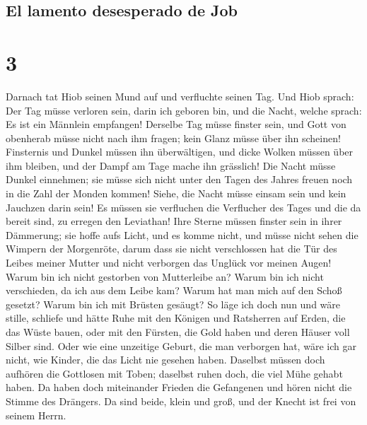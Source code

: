 \hypertarget{el-lamento-desesperado-de-job}{%
\subsection{El lamento desesperado de
Job}\label{el-lamento-desesperado-de-job}}

\hypertarget{section-2}{%
\section{3}\label{section-2}}

 Darnach tat Hiob seinen Mund auf und verfluchte seinen
Tag.  Und Hiob sprach:  Der Tag müsse
verloren sein, darin ich geboren bin, und die Nacht, welche sprach: Es
ist ein Männlein empfangen!  Derselbe Tag müsse finster
sein, und Gott von obenherab müsse nicht nach ihm fragen; kein Glanz
müsse über ihn scheinen!  Finsternis und Dunkel müssen ihn
überwältigen, und dicke Wolken müssen über ihm bleiben, und der Dampf am
Tage mache ihn grässlich!  Die Nacht müsse Dunkel
einnehmen; sie müsse sich nicht unter den Tagen des Jahres freuen noch
in die Zahl der Monden kommen!  Siehe, die Nacht müsse
einsam sein und kein Jauchzen darin sein!  Es müssen sie
verfluchen die Verflucher des Tages und die da bereit sind, zu erregen
den Leviathan!  Ihre Sterne müssen finster sein in ihrer
Dämmerung; sie hoffe aufs Licht, und es komme nicht, und müsse nicht
sehen die Wimpern der Morgenröte,  darum dass sie nicht
verschlossen hat die Tür des Leibes meiner Mutter und nicht verborgen
das Unglück vor meinen Augen!  Warum bin ich nicht
gestorben von Mutterleibe an? Warum bin ich nicht verschieden, da ich
aus dem Leibe kam?  Warum hat man mich auf den Schoß
gesetzt? Warum bin ich mit Brüsten gesäugt?  So läge ich
doch nun und wäre stille, schliefe und hätte Ruhe  mit
den Königen und Ratsherren auf Erden, die das Wüste bauen,
 oder mit den Fürsten, die Gold haben und deren Häuser
voll Silber sind.  Oder wie eine unzeitige Geburt, die
man verborgen hat, wäre ich gar nicht, wie Kinder, die das Licht nie
gesehen haben.  Daselbst müssen doch aufhören die
Gottlosen mit Toben; daselbst ruhen doch, die viel Mühe gehabt haben.
 Da haben doch miteinander Frieden die Gefangenen und
hören nicht die Stimme des Drängers.  Da sind beide,
klein und groß, und der Knecht ist frei von seinem Herrn.
